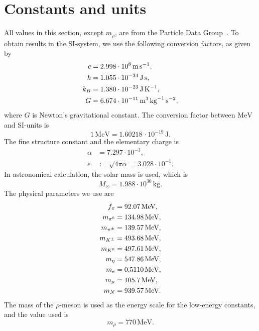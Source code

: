 \section{Constants and units}
\label{section: units}

All values in this section, except $m_\rho$, are from the Particle Data Group~\cite{particledatagroupReviewParticlePhysics2020}.
To obtain results in the SI-system, we use the following conversion factors, as given by
%
\begin{align}
    \label{speed of ligh}
    c       &= 2.998 \cdot 10^8     \, \text{m} \, \text{s}^{-1}, \\
    \label{hbar}
    \hbar   &= 1.055 \cdot 10^{-34} \, \text{J} \, \text{s}, \\
    \label{Boltzmanns constat}
    k_B     &= 1.380 \cdot 10^{-23} \, \text{J} \, \text K^{-1}, \\
    \label{Newtons gravitational constant}
    G       &= 6.674 \cdot 10^{-11} \, \text m^3 \, \text{kg}^{-1} \, \text s^{-2},
\end{align}
%
where $G$ is Newton's gravitational constant.
The conversion factor between $\text{MeV}$ and SI-units is
%
\begin{equation}
    \label{electronvolt}
    1 \, \text{MeV} = 1.60218\, \cdot 10^{-19} \, \text{J}. 
\end{equation}
%
The fine structure constant and the elementary charge is
%
\begin{align}
    \label{Fine structure constant}
    \alpha &= 7.297 \cdot 10^{-3}, \\
    \label{Elementary charge}
    e &:= \sqrt{4 \pi \alpha} =  3.028\cdot 10^{-1}.
\end{align}
%
In astronomical calculation, the solar mass is used, which is
%
\begin{equation}
    \label{solar mass}
    M_\odot = 1.988 \cdot 10^{30} \, \text{kg}.
\end{equation}
%
The physical parameters we use are
%
\begingroup
\allowdisplaybreaks %
\begin{align}
    \label{pion decay constant}
    f_\pi & =  92.07 \, \text{MeV}, \\
    \label{pion mass}
    m_{\pi^0} & = 134.98 \, \text{MeV}, \\
    \label{charged pion mass}
    m_{{\pi^\pm}} &= 139.57 \, \text{MeV}, \\
    m_{{K^\pm}} & = 493.68\,\text{MeV}, \\
    m_{{K^0}} & = 497.61\,\text{MeV}, \\
    m_\eta & = 547.86 \, \text{MeV}, \\
    m_e &= 0.5110 \, \text{MeV}, \\
    m_\mu &= 105.7 \, \text{MeV}, \\
    \label{mass of neutron}
    m_N &= 939.57 \, \text{MeV}.
\end{align}
\endgroup
%
The mass of the $\rho$-meson is used as the energy scale for the low-energy constants, and the value used is
%
\begin{equation}
    m_\rho = 770\, \text{MeV}.
\end{equation}

